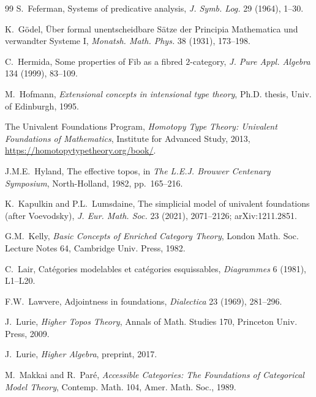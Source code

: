\documentclass[11pt]{article}
\theoremstyle{plain}
\theoremstyle{definition}
\begin{document}
\begin{thebibliography}{99}
S.~Feferman,
\newblock Systems of predicative analysis,
\newblock \emph{J. Symb. Log.} 29 (1964), 1--30.

K.~G\"odel,
\newblock \"Uber formal unentscheidbare S\"atze der Principia Mathematica und verwandter Systeme I,
\newblock \emph{Monatsh. Math. Phys.} 38 (1931), 173--198.

C.~Hermida,
\newblock Some properties of Fib as a fibred $2$-category,
\newblock \emph{J. Pure Appl. Algebra} 134 (1999), 83--109.

M.~Hofmann,
\newblock \emph{Extensional concepts in intensional type theory},
\newblock Ph.D. thesis, Univ. of Edinburgh, 1995.

The Univalent Foundations Program,
\newblock \emph{Homotopy Type Theory: Univalent Foundations of Mathematics},
\newblock Institute for Advanced Study, 2013,
\newblock \url{https://homotopytypetheory.org/book/}.

J.M.E.~Hyland,
\newblock The effective topos,
\newblock in \emph{The L.E.J. Brouwer Centenary Symposium}, North-Holland, 1982, pp.~165--216.

K.~Kapulkin and P.L.~Lumsdaine,
\newblock The simplicial model of univalent foundations (after Voevodsky),
\newblock \emph{J. Eur. Math. Soc.} 23 (2021), 2071--2126; arXiv:1211.2851.

G.M.~Kelly,
\newblock \emph{Basic Concepts of Enriched Category Theory},
\newblock London Math. Soc. Lecture Notes 64, Cambridge Univ. Press, 1982.

C.~Lair,
\newblock Cat\'egories modelables et cat\'egories esquissables,
\newblock \emph{Diagrammes} 6 (1981), L1--L20.

F.W.~Lawvere,
\newblock Adjointness in foundations,
\newblock \emph{Dialectica} 23 (1969), 281--296.

J.~Lurie,
\newblock \emph{Higher Topos Theory},
\newblock Annals of Math. Studies 170, Princeton Univ. Press, 2009.

J.~Lurie,
\newblock \emph{Higher Algebra},
\newblock preprint, 2017.

M.~Makkai and R.~Par\'e,
\newblock \emph{Accessible Categories: The Foundations of Categorical Model Theory},
\newblock Contemp. Math. 104, Amer. Math. Soc., 1989.


\end{thebibliography}
\end{document}
